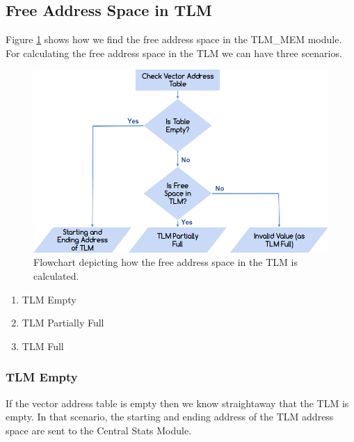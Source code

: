 \documentclass{listhesis}
\begin{document}
\subsection{Free Address Space in TLM}
Figure \ref{fig:freeSpaceTLM} shows how we find the free address space in the TLM{\_}MEM module. For calculating the free address space in the TLM we can have three scenarios. 
\begin{figure}
  \includegraphics[width=\linewidth]{freespace.png}
  \centering
  \caption{Flowchart depicting how the free address space in the TLM is calculated.}
  \label{fig:freeSpaceTLM}
\end{figure}
\begin{enumerate}
  \item TLM Empty 
  \item TLM Partially Full
  \item TLM Full
\end{enumerate}
\subsubsection{TLM Empty}
If the vector address table is empty then we know straightaway that the TLM is empty. In that scenario, the starting and ending address of the TLM address space are sent to the Central Stats Module.\\ 
\end{document}
